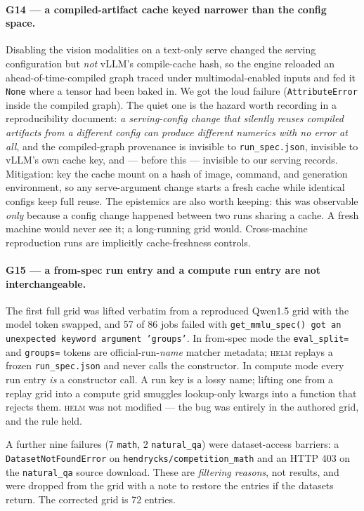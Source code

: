 \documentclass[11pt]{report}
\newcommand{\code}[1]{\texttt{#1}}
\begin{document}
\paragraph{G14 --- a compiled-artifact cache keyed narrower than the config space.}
Disabling the vision modalities on a text-only serve changed the serving
configuration but \emph{not} vLLM's compile-cache hash, so the engine reloaded an
ahead-of-time-compiled graph traced under multimodal-enabled inputs and fed it
\code{None} where a tensor had been baked in. We got the loud failure
(\code{AttributeError} inside the compiled graph). The quiet one is the hazard worth
recording in a reproducibility document: \emph{a serving-config change that silently
reuses compiled artifacts from a different config can produce different numerics
with no error at all}, and the compiled-graph provenance is invisible to
\code{run\_spec.json}, invisible to vLLM's own cache key, and --- before this ---
invisible to our serving records. Mitigation: key the cache mount on a hash of
image, command, and generation environment, so any serve-argument change starts a
fresh cache while identical configs keep full reuse. The epistemics are also worth
keeping: this was observable \emph{only} because a config change happened between
two runs sharing a cache. A fresh machine would never see it; a long-running grid
would. Cross-machine reproduction runs are implicitly cache-freshness controls.

\paragraph{G15 --- a from-spec run entry and a compute run entry are not
interchangeable.} The first full grid was lifted verbatim from a reproduced Qwen1.5
grid with the model token swapped, and 57 of 86 jobs failed with
\code{get\_mmlu\_spec() got an unexpected keyword argument 'groups'}. In from-spec
mode the \code{eval\_split=} and \code{groups=} tokens are official-run-\emph{name}
matcher metadata; \textsc{helm} replays a frozen \code{run\_spec.json} and never
calls the constructor. In compute mode every run entry \emph{is} a constructor call.
A run key is a lossy name; lifting one from a replay grid into a compute grid
smuggles lookup-only kwargs into a function that rejects them. \textsc{helm} was not
modified --- the bug was entirely in the authored grid, and the rule held.

A further nine failures (7 \code{math}, 2 \code{natural\_qa}) were dataset-access
barriers: a \code{DatasetNotFoundError} on \code{hendrycks/competition\_math} and an
HTTP 403 on the \code{natural\_qa} source download. These are \emph{filtering
reasons}, not results, and were dropped from the grid with a note to restore the
entries if the datasets return. The corrected grid is 72 entries.
\end{document}
